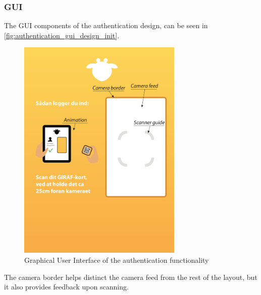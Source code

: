 \subsubsection{GUI}
The GUI components of the authentication design, can be seen in \autoref{fig:authentication_gui_design_init}.
\begin{figure}[h]
	\centering
	\includegraphics[width=0.7\textwidth]{gfx/authentication_gui_design_init.pdf}
	\caption{Graphical User Interface of the authentication functionality}
	\label{fig:authentication_gui_design_init}
\end{figure}
The camera border helps distinct the camera feed from the rest of the layout, but it also provides feedback upon scanning. 